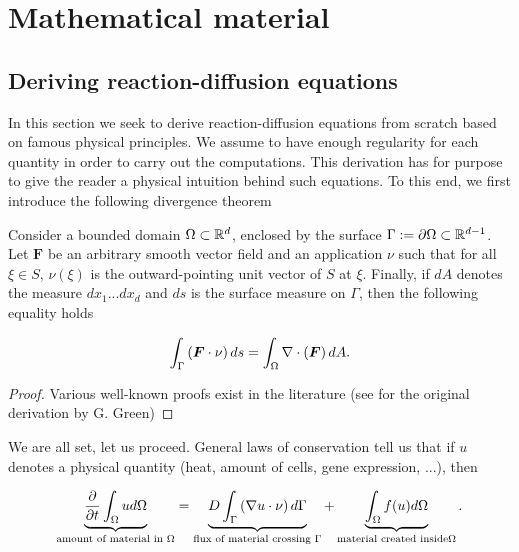 \documentclass[12pt]{article}
\begin{document}

%


%


%

%

\newpage

\appendix

\section{Mathematical material}

\subsection{Deriving reaction-diffusion equations}

In this section we seek to derive reaction-diffusion equations from scratch based on famous physical principles. We assume to have enough regularity for each quantity in order to carry out the computations. This derivation has for purpose to give the reader a physical intuition behind such equations. To this end, we first introduce the following divergence theorem

\begin{theorem}
	Consider a bounded domain $\Omega \subset \mathbb{R}^d$, enclosed by the surface $\Gamma := \partial \Omega \subset \mathbb{R}^{d-1}$. Let $\bm F$ be an arbitrary smooth vector field and an application $\nu$ such that for all $\xi \in S$, $\nu(\xi)$ is the outward-pointing unit vector of $S$ at $\xi$. Finally, if $dA$ denotes the measure $d x_1 ... d x_d$ and $ds$ is the surface measure on $\Gamma$, then the following equality holds
	
	$$\int_\Gamma \left( \bm F \cdot \nu \right) ds = \int_\Omega \nabla \cdot \left( \bm F\right) d A.$$
\end{theorem}

\begin{proof}
	Various well-known proofs exist in the literature (see \cite{https://doi.org/10.48550/arxiv.0807.0088} for the original derivation by G. Green)
\end{proof}

We are all set, let us proceed. General laws of conservation tell us that if $u$ denotes a physical quantity (heat, amount of cells, gene expression, ...), then

$$\underbrace{\frac{\partial}{\partial t} \int_{\Omega} u d\Omega}_{\text{amount of material in } \Omega} =  \underbrace{D \int_\Gamma \left( \nabla u \cdot \nu \right) d\Gamma}_{\text{flux of material crossing } \Gamma} + \underbrace{\int_\Omega f(u) d\Omega}_{\text{material created inside} \Omega}.$$
\end{document}
